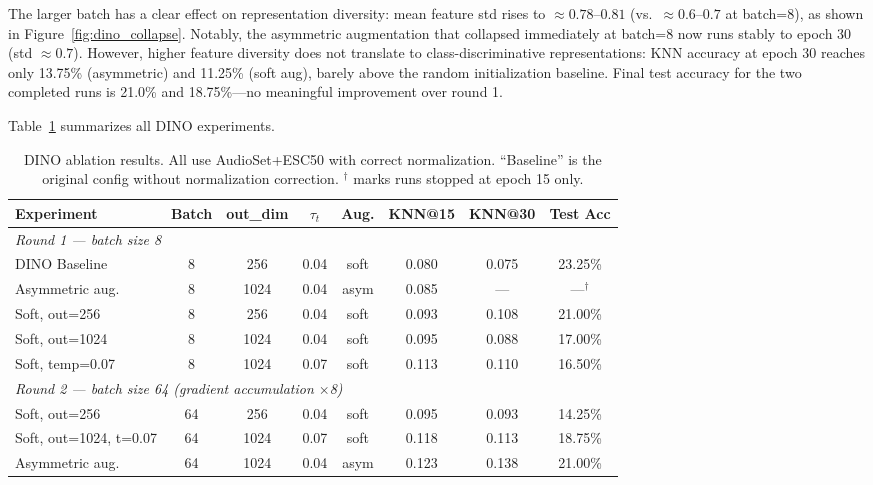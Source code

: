 \documentclass{article}
\begin{document}
The larger batch has a clear effect on representation diversity: mean feature std rises to $\approx 0.78$--$0.81$ (vs.\ $\approx 0.6$--$0.7$ at batch=8), as shown in Figure~\ref{fig:dino_collapse}. Notably, the asymmetric augmentation that collapsed immediately at batch=8 now runs stably to epoch 30 (std $\approx 0.7$). However, higher feature diversity does not translate to class-discriminative representations: KNN accuracy at epoch 30 reaches only 13.75\% (asymmetric) and 11.25\% (soft aug), barely above the random initialization baseline. Final test accuracy for the two completed runs is 21.0\% and 18.75\%—no meaningful improvement over round 1.

Table~\ref{tab:dino} summarizes all DINO experiments.

\begin{table}[htbp]
\centering
\caption{DINO ablation results. All use AudioSet+ESC50 with correct normalization. ``Baseline'' is the original config without normalization correction. $^\dagger$ marks runs stopped at epoch 15 only.}
\label{tab:dino}
\begin{tabular}{lccccccc}
\toprule
Experiment & Batch & out\_dim & $\tau_t$ & Aug. & KNN@15 & KNN@30 & Test Acc \\
\midrule
\multicolumn{8}{l}{\textit{Round 1 — batch size 8}} \\
DINO Baseline        & 8 & 256  & 0.04 & soft & 0.080 & 0.075 & 23.25\% \\
Asymmetric aug.      & 8 & 1024 & 0.04 & asym & 0.085 & ---   & ---$^\dagger$ \\
Soft, out=256        & 8 & 256  & 0.04 & soft & 0.093 & 0.108 & 21.00\% \\
Soft, out=1024       & 8 & 1024 & 0.04 & soft & 0.095 & 0.088 & 17.00\% \\
Soft, temp=0.07      & 8 & 1024 & 0.07 & soft & 0.113 & 0.110 & 16.50\% \\
\midrule
\multicolumn{8}{l}{\textit{Round 2 — batch size 64 (gradient accumulation $\times$8)}} \\
Soft, out=256        & 64 & 256  & 0.04 & soft & 0.095 & 0.093 & 14.25\% \\
Soft, out=1024, t=0.07 & 64 & 1024 & 0.07 & soft & 0.118 & 0.113 & 18.75\% \\
Asymmetric aug.      & 64 & 1024 & 0.04 & asym & 0.123 & 0.138 & 21.00\% \\
\bottomrule
\end{tabular}
\end{table}
\end{document}
